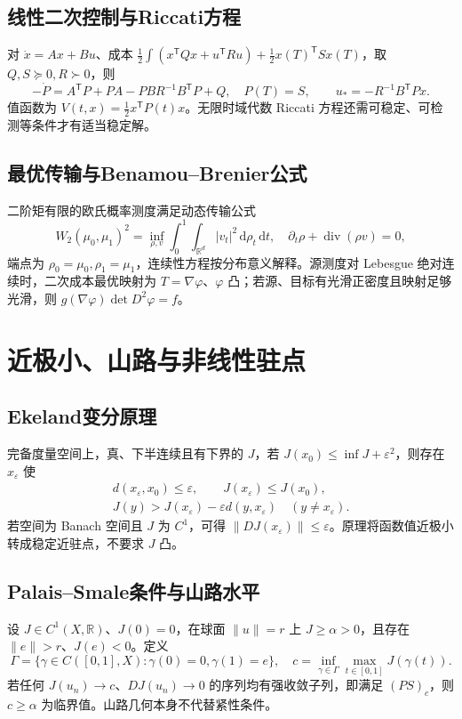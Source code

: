 \documentclass[../main.tex]{subfiles}
\begin{document}
\subsection{线性二次控制与Riccati方程}
对 $\dot x=Ax+Bu$、成本 $\frac12\int(x^{\mathsf T}Qx+u^{\mathsf T}Ru)+\frac12x(T)^{\mathsf T}Sx(T)$，取 $Q,S\succeq0,R\succ0$，则
\[
-\dot P=A^{\mathsf T}P+PA-PBR^{-1}B^{\mathsf T}P+Q,\quad P(T)=S,
\qquad u_*=-R^{-1}B^{\mathsf T}Px.
\]
值函数为 $V(t,x)=\frac12x^{\mathsf T}P(t)x$。无限时域代数 Riccati 方程还需可稳定、可检测等条件才有适当稳定解。
\subsection{最优传输与Benamou--Brenier公式}
二阶矩有限的欧氏概率测度满足动态传输公式
\[
W_2(\mu_0,\mu_1)^2=\inf_{\rho,v}\int_0^1\int_{\mathbb R^d}|v_t|^2\,\mathrm d\rho_t\,\mathrm dt,
\quad\partial_t\rho+\operatorname{div}(\rho v)=0,
\]
端点为 $\rho_0=\mu_0,\rho_1=\mu_1$，连续性方程按分布意义解释。源测度对 Lebesgue 绝对连续时，二次成本最优映射为 $T=\nabla\varphi$、$\varphi$ 凸；若源、目标有光滑正密度且映射足够光滑，则 $g(\nabla\varphi)\det D^2\varphi=f$。
\section{近极小、山路与非线性驻点}
\subsection{Ekeland变分原理}
完备度量空间上，真、下半连续且有下界的 $J$，若 $J(x_0)\le\inf J+\varepsilon^2$，则存在 $x_\varepsilon$ 使
\begin{gather*}
d(x_\varepsilon,x_0)\le\varepsilon,\qquad J(x_\varepsilon)\le J(x_0),\\
J(y)>J(x_\varepsilon)-\varepsilon d(y,x_\varepsilon)\quad(y\ne x_\varepsilon).
\end{gather*}
若空间为 Banach 空间且 $J$ 为 $C^1$，可得 $\|DJ(x_\varepsilon)\|\le\varepsilon$。原理将函数值近极小转成稳定近驻点，不要求 $J$ 凸。
\subsection{Palais--Smale条件与山路水平}
设 $J\in C^1(X,\mathbb R)$、$J(0)=0$，在球面 $\|u\|=r$ 上 $J\ge\alpha>0$，且存在 $\|e\|>r$、$J(e)<0$。定义
\[
\Gamma=\{\gamma\in C([0,1],X):\gamma(0)=0,\gamma(1)=e\},\quad
c=\inf_{\gamma\in\Gamma}\max_{t\in[0,1]}J(\gamma(t)).
\]
若任何 $J(u_n)\to c$、$DJ(u_n)\to0$ 的序列均有强收敛子列，即满足 $(PS)_c$，则 $c\ge\alpha$ 为临界值。山路几何本身不代替紧性条件。
\end{document}
